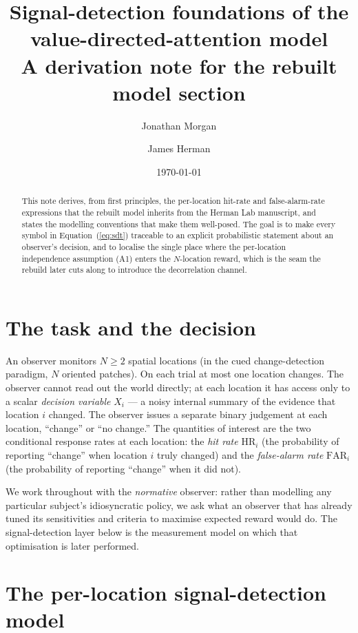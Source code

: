 \documentclass[11pt]{article}
\title{Signal-detection foundations of the value-directed-attention model\\[2pt]
       \large A derivation note for the rebuilt model section}
\author{Jonathan Morgan \and James Herman}
\date{\today}
\theoremstyle{remark}
\newcommand{\HR}{\mathrm{HR}}
\newcommand{\FAR}{\mathrm{FAR}}
\newcommand{\Nloc}{N}
\begin{document}
\maketitle

\begin{abstract}
\noindent
This note derives, from first principles, the per-location hit-rate
and false-alarm-rate expressions that the rebuilt model inherits from
the Herman Lab manuscript, and states the modelling conventions that
make them well-posed. The goal is to make every symbol in
Equation~(\ref{eq:sdt}) traceable to an explicit probabilistic
statement about an observer's decision, and to localise the single
place where the per-location independence assumption (A1) enters the
$\Nloc$-location reward, which is the seam the rebuild later cuts along
to introduce the decorrelation channel.
\end{abstract}

\section{The task and the decision}
\label{sec:task}

An observer monitors $\Nloc \ge 2$ spatial locations (in the cued
change-detection paradigm, $\Nloc$ oriented patches). On each trial at
most one location changes. The observer cannot read out the world
directly; at each location it has access only to a scalar
\emph{decision variable} $X_i$ --- a noisy internal summary of the
evidence that location $i$ changed. The observer issues a separate
binary judgement at each location, ``change'' or ``no change.'' The
quantities of interest are the two conditional response rates at each
location: the \emph{hit rate} $\HR_i$ (the probability of reporting
``change'' when location $i$ truly changed) and the \emph{false-alarm
rate} $\FAR_i$ (the probability of reporting ``change'' when it did
not).

We work throughout with the \emph{normative} observer: rather than
modelling any particular subject's idiosyncratic policy, we ask what
an observer that has already tuned its sensitivities and criteria to
maximise expected reward would do. The signal-detection layer below is
the measurement model on which that optimisation is later performed.

\section{The per-location signal-detection model}
\label{sec:model}
\end{document}
